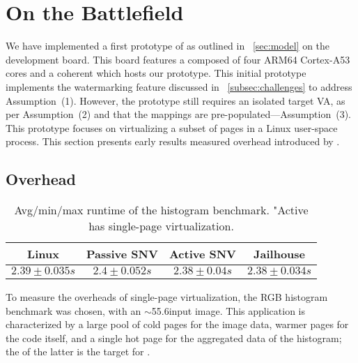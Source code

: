 \section{On the Battlefield}
    We have implemented a first prototype of \sname as outlined in \sect~\ref{sec:model} on the \zculong development board.
    This board features a \soc composed of four ARM64 Cortex-A53 \cpu cores and a coherent \fpga which hosts our \sname prototype.
    This initial prototype implements the watermarking feature discussed in \sect~\ref{subsec:challenges} to address Assumption~(1).
    However, the prototype still requires an isolated target VA, as per Assumption~(2) and that the \va mappings are pre-populated---Assumption~(3).
    This prototype focuses on virtualizing a subset of pages in a Linux user-space process. This section presents early results \wrt measured overhead introduced by \sname.
    
    
    \subsection{Overhead}

        \begin{table}[ht]
            \centering
            \begin{tabular}{cccc}
                Linux & Passive SNV & Active SNV & Jailhouse  \\
                 \toprule
                 $2.39 \pm 0.035s$ & $2.4 \pm 0.052s$ & $2.38 \pm 0.04s$ & $2.38 \pm 0.034s$ \\
                 \bottomrule
            \end{tabular}
            \caption{Avg/min/max runtime of the histogram benchmark. "Active  has single-page virtualization.}
            \label{tab:OH-SNV}
            \vspace{-0.8cm}
        \end{table}

        To measure the overheads of single-page virtualization, the RGB histogram benchmark was chosen, with an $\sim$55.6\mb input image. This application is characterized by a large pool of cold pages for the image data, warmer pages for the code itself, and a single hot page for the aggregated data of the histogram; the \va of the latter is the target for \sname.

